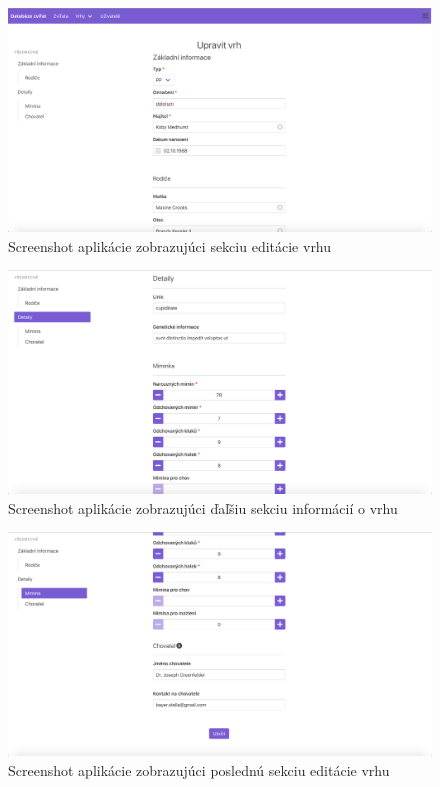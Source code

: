 \begin{figure}[H]
	\includegraphics[width=1.0\textwidth]{media/priloha/vrh/editacia/1.png}
	\caption{Screenshot aplikácie zobrazujúci sekciu editácie vrhu}
\end{figure}

\begin{figure}[H]
	\includegraphics[width=1.0\textwidth]{media/priloha/vrh/editacia/2.png}
	\caption{Screenshot aplikácie zobrazujúci ďaľšiu sekciu informácií o vrhu}
\end{figure}

\begin{figure}[H]
	\includegraphics[width=1.0\textwidth]{media/priloha/vrh/editacia/3.png}
	\caption{Screenshot aplikácie zobrazujúci poslednú sekciu editácie vrhu}
\end{figure}

